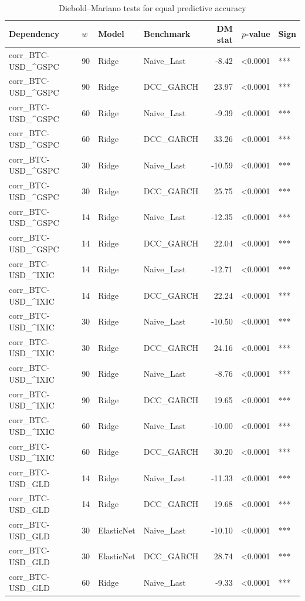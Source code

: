 \begin{table}[H]
\centering
\small
\caption{Diebold--Mariano tests for equal predictive accuracy}
\label{tab:dm_tests}
\begin{tabular}{llllrrl}
\toprule
Dependency & $w$ & Model & Benchmark & DM stat & $p$-value & Sign \\
\midrule
corr_BTC-USD_^GSPC & 90 & Ridge & Naive_Last & -8.42 & <0.0001 & *** \\
corr_BTC-USD_^GSPC & 90 & Ridge & DCC_GARCH & 23.97 & <0.0001 & *** \\
corr_BTC-USD_^GSPC & 60 & Ridge & Naive_Last & -9.39 & <0.0001 & *** \\
corr_BTC-USD_^GSPC & 60 & Ridge & DCC_GARCH & 33.26 & <0.0001 & *** \\
corr_BTC-USD_^GSPC & 30 & Ridge & Naive_Last & -10.59 & <0.0001 & *** \\
corr_BTC-USD_^GSPC & 30 & Ridge & DCC_GARCH & 25.75 & <0.0001 & *** \\
corr_BTC-USD_^GSPC & 14 & Ridge & Naive_Last & -12.35 & <0.0001 & *** \\
corr_BTC-USD_^GSPC & 14 & Ridge & DCC_GARCH & 22.04 & <0.0001 & *** \\
corr_BTC-USD_^IXIC & 14 & Ridge & Naive_Last & -12.71 & <0.0001 & *** \\
corr_BTC-USD_^IXIC & 14 & Ridge & DCC_GARCH & 22.24 & <0.0001 & *** \\
corr_BTC-USD_^IXIC & 30 & Ridge & Naive_Last & -10.50 & <0.0001 & *** \\
corr_BTC-USD_^IXIC & 30 & Ridge & DCC_GARCH & 24.16 & <0.0001 & *** \\
corr_BTC-USD_^IXIC & 90 & Ridge & Naive_Last & -8.76 & <0.0001 & *** \\
corr_BTC-USD_^IXIC & 90 & Ridge & DCC_GARCH & 19.65 & <0.0001 & *** \\
corr_BTC-USD_^IXIC & 60 & Ridge & Naive_Last & -10.00 & <0.0001 & *** \\
corr_BTC-USD_^IXIC & 60 & Ridge & DCC_GARCH & 30.20 & <0.0001 & *** \\
corr_BTC-USD_GLD & 14 & Ridge & Naive_Last & -11.33 & <0.0001 & *** \\
corr_BTC-USD_GLD & 14 & Ridge & DCC_GARCH & 19.68 & <0.0001 & *** \\
corr_BTC-USD_GLD & 30 & ElasticNet & Naive_Last & -10.10 & <0.0001 & *** \\
corr_BTC-USD_GLD & 30 & ElasticNet & DCC_GARCH & 28.74 & <0.0001 & *** \\
corr_BTC-USD_GLD & 60 & Ridge & Naive_Last & -9.33 & <0.0001 & *** \\

\end{tabular}
\end{table}
